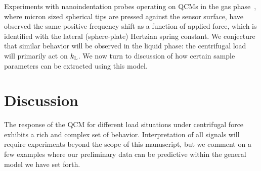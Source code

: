
Experiments with nanoindentation probes operating on QCMs in the gas
phase~\cite{borovsky2001measuring}, where micron sized spherical tips are
pressed against the sensor surface, have observed the same positive
frequency shift as a function of applied force,  which is identified with
the lateral (sphere-plate) Hertzian spring constant.  We conjecture that
similar behavior will be observed in the liquid phase: the centrifugal load
will primarily act on $k_\mathrm{L}$.  We now turn to discussion of how certain
sample parameters can be extracted using this model.

\section*{Discussion}
\label{sec:discussion}
The response of the QCM for different load situations under centrifugal
force exhibits a rich and complex set of behavior. Interpretation of all
signals will require experiments beyond the scope of this
manuscript, but we comment on a few examples where our
preliminary data can be predictive within the general model we have set forth.

